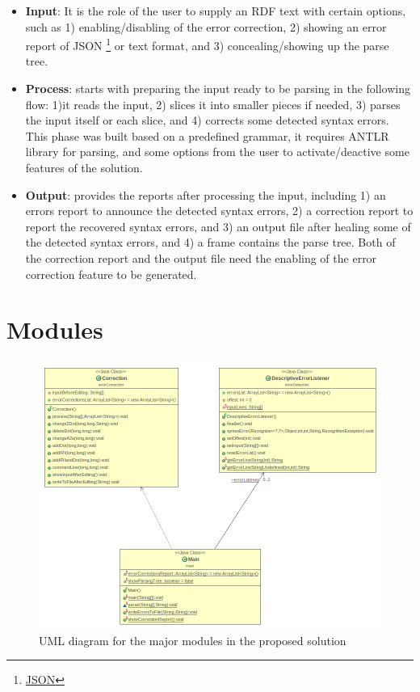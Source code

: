  \begin{itemize}
 \item \textbf {Input}: It is the role of the user to supply an RDF text with certain options, such as 1) enabling/disabling of the error correction, 2) showing an error report of JSON \footnote{\href{https://www.json.org/}{JSON}} or text format, and 3) concealing/showing up the parse tree.
\item \textbf{Process}: starts with preparing the input ready to be parsing in the following flow: 1)it reads the input, 2) slices it into smaller pieces if needed, 3) parses the input itself or each slice, and 4) corrects some detected syntax errors. This phase was built based on a predefined grammar, it requires ANTLR library for parsing, and some options from the user to activate/deactive some features of the solution.   
\item \textbf{Output}: provides the reports after processing the input, including 1) an errors report to announce the detected syntax errors, 2) a correction report to report the recovered syntax errors, and 3) an output file after healing some of the detected syntax errors, and 4) a frame contains the parse tree. Both of the correction report and the output file need the enabling of the error correction feature to be generated. 
\end{itemize}



\section {Modules} 

	\begin{figure}[ht]
	\begin{center}
		\includegraphics[scale=0.5,angle=0]{images/modules.png}
				\setlength\belowcaptionskip{-7mm}
		\caption{UML diagram for the major modules in the proposed solution}
		\label{Fig:UML}
	\end{center}
\end{figure}

